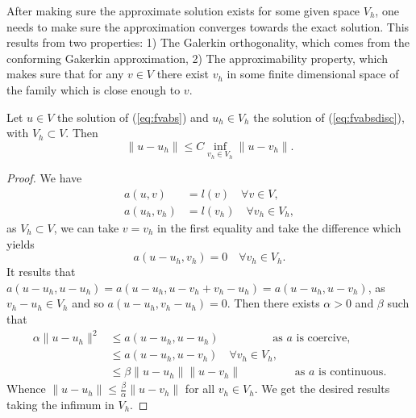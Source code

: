 After making sure the approximate solution exists for some given space $V_h$, one needs to make sure the approximation converges towards the exact solution. This results from two properties: 1) The Galerkin orthogonality, which comes from the conforming Gakerkin approximation,   2) The approximability property, which makes sure that for any $v\in V$ there exist $v_h$ in some finite dimensional space of the family which is close enough to $v$. 


\begin{lemma}[C\'ea]
Let $u\in V$ the solution of (\ref{eq:fvabs}) and $u_h\in V_h$ the solution of
  (\ref{eq:fvabsdisc}), with $V_h\subset V$. Then
  $$\|u-u_h\|\leq C \inf_{v_h\in V_h} \|u-v_h\|.$$
\end{lemma}
\begin{proof}
We have
  \begin{align*}
    a(u,v)&=l(v)\quad\forall v\in V,\\
    a(u_h,v_h)&=l(v_h)\quad\forall v_h\in V_h,
  \end{align*}
as $V_h\subset V$, we can take $v=v_h$ in the first equality
and take the difference which yields
$$a(u-u_h,v_h)=0\quad\forall v_h\in V_h.$$
It results that $a(u-u_h,u-u_h)=a(u-u_h,u-v_h+v_h-u_h)=a(u-u_h,u-v_h)$,
as $v_h-u_h\in V_h$ and so $a(u-u_h,v_h-u_h)=0$.
Then there exists  $\alpha>0$ and $\beta$ such that
\begin{align*}
  \alpha \|u-u_h\|^2 &\leq a(u-u_h,u-u_h) \hspace{2cm}
                               \mbox{as $a$ is coercive},\\
  &\leq a(u-u_h,u-v_h) \quad\forall v_h\in V_h,\\
  &\leq \beta\|u-u_h\|\|u-v_h\|\hspace{2cm}
                               \mbox{as $a$ is continuous}.
\end{align*}
Whence $\|u-u_h\|\leq \frac \beta\alpha \|u-v_h\|$ for all
$v_h\in V_h$. We get the desired results taking the infimum in $V_h$.
\end{proof}
 
 
 
